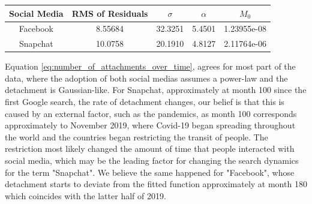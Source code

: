 \begin{table}[H]
\begin{tabular}{|c c c c c|}
\hline
Social Media & RMS of Residuals & $\sigma$ & $\alpha$ & $M_{0}$ \\ \hline
Facebook & 8.55684  & 32.3251 & 5.4501  & 1.23955e-08 \\ \hline
Snapchat & 10.0758 & 20.1910 & 4.8127  & 2.11764e-06 \\ \hline
\end{tabular}
\end{table}

Equation \ref{eq:number_of_attachments_over_time}, agrees for most part of the data, where the adoption of both social medias assumes a power-law and the detachment is Gaussian-like. For Snapchat, approximately at month 100 since the first Google search, the rate of detachment changes, our belief is that this is caused by an external factor, such as the pandemics, as month 100 corresponds approximately to November 2019, where Covid-19 began spreading throughout the world and the countries began restricting the transit of people. The restriction most likely changed the amount of time that people interacted with social media, which may be the leading factor for changing the search dynamics for the term "Snapchat". We believe the same happened for "Facebook", whose detachment starts to deviate from the fitted function approximately at month 180 which coincides with the latter half of 2019.